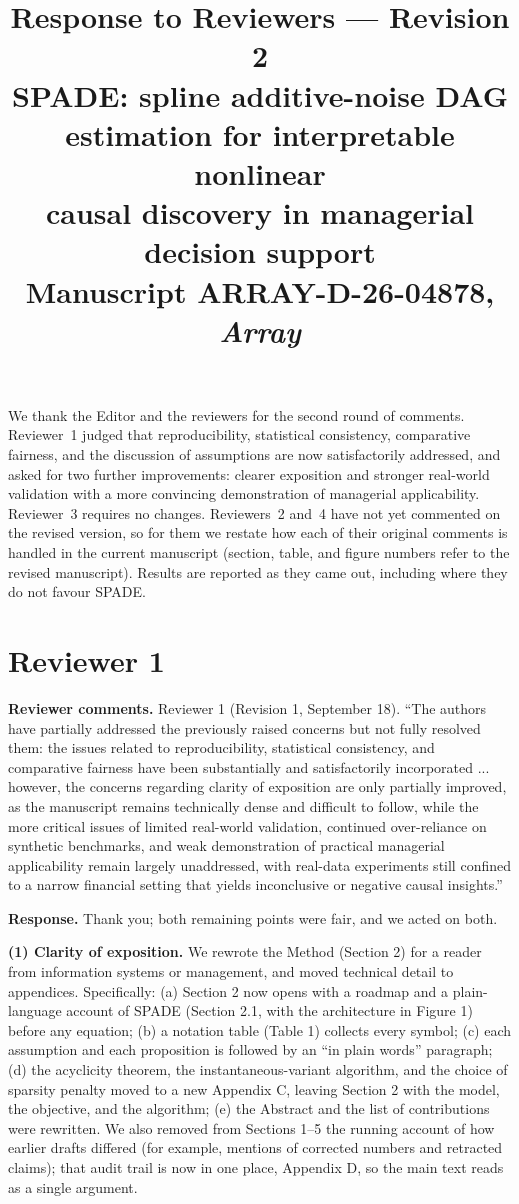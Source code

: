 \documentclass[11pt]{article}
\title{Response to Reviewers --- Revision 2\\
\large SPADE: spline additive-noise DAG estimation for interpretable nonlinear\\
causal discovery in managerial decision support\\
Manuscript ARRAY-D-26-04878, \emph{Array}}
\author{}
\date{}
\begin{document}
\maketitle
We thank the Editor and the reviewers for the second round of comments. Reviewer~1 judged that reproducibility, statistical consistency, comparative fairness, and the discussion of assumptions are now satisfactorily addressed, and asked for two further improvements: clearer exposition and stronger real-world validation with a more convincing demonstration of managerial applicability. Reviewer~3 requires no changes. Reviewers~2 and~4 have not yet commented on the revised version, so for them we restate how each of their original comments is handled in the current manuscript (section, table, and figure numbers refer to the revised manuscript). Results are reported as they came out, including where they do not favour SPADE.

\section*{Reviewer 1}
\textbf{Reviewer comments.} Reviewer 1 (Revision 1, September 18). ``The authors have partially addressed the previously raised concerns but not fully resolved them: the issues related to reproducibility, statistical consistency, and comparative fairness have been substantially and satisfactorily incorporated ... however, the concerns regarding clarity of exposition are only partially improved, as the manuscript remains technically dense and difficult to follow, while the more critical issues of limited real-world validation, continued over-reliance on synthetic benchmarks, and weak demonstration of practical managerial applicability remain largely unaddressed, with real-data experiments still confined to a narrow financial setting that yields inconclusive or negative causal insights.''

\textbf{Response.} Thank you; both remaining points were fair, and we acted on both.

\textbf{(1) Clarity of exposition.} We rewrote the Method (Section 2) for a reader from information systems or management, and moved technical detail to appendices. Specifically: (a) Section 2 now opens with a roadmap and a plain-language account of SPADE (Section 2.1, with the architecture in Figure 1) before any equation; (b) a notation table (Table 1) collects every symbol; (c) each assumption and each proposition is followed by an ``in plain words'' paragraph; (d) the acyclicity theorem, the instantaneous-variant algorithm, and the choice of sparsity penalty moved to a new Appendix C, leaving Section 2 with the model, the objective, and the algorithm; (e) the Abstract and the list of contributions were rewritten. We also removed from Sections 1--5 the running account of how earlier drafts differed (for example, mentions of corrected numbers and retracted claims); that audit trail is now in one place, Appendix D, so the main text reads as a single argument.
\end{document}
